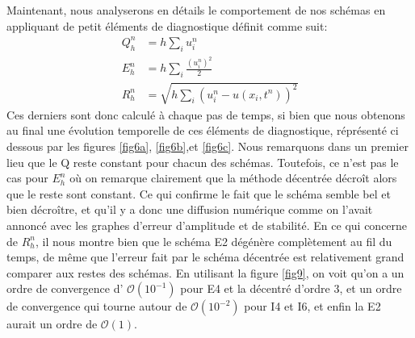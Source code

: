 \documentclass{article}
\begin{document}
Maintenant, nous analyserons en détails le comportement de nos schémas en appliquant de petit éléments de diagnostique définit comme suit:\\
\begin{equation}
    \begin{aligned}
        Q_h^n & = h {\sum}_i u_i^n \\
        E_h^n & = h {\sum}_i \frac{(u_i^n)^2}{2} \\
        R_h^n & = \sqrt{h {\sum}_i (u_i^n - u(x_i,t^n))^2}
    \end{aligned}
\end{equation}
Ces derniers sont donc calculé à chaque pas de temps, si bien que nous obtenons au final une évolution temporelle de ces éléments de diagnostique, réprésenté ci dessous par les figures  \ref{fig6a}, \ref{fig6b},et \ref{fig6c}. Nous remarquons dans un premier lieu que le Q reste constant pour chacun des schémas. Toutefois, ce n'est pas le cas pour $E_h^n$ où on remarque clairement que la méthode décentrée décroît alors que le reste sont constant. Ce qui confirme le fait que le schéma semble bel et bien décroître, et qu'il y a donc une diffusion numérique comme on l'avait annoncé avec les graphes d'erreur d'amplitude et de stabilité. En ce qui concerne de $R_h^n$, il nous montre bien que le schéma E2 dégénère complètement au fil du temps, de même que l'erreur fait par le schéma décentrée est relativement grand comparer aux restes des schémas. En utilisant la figure \ref{fig9}, on voit qu'on a un ordre de convergence d' $\mathcal{O}(10^{-1})$ pour E4 et la décentré d'ordre 3, et un ordre de convergence qui tourne autour de $\mathcal{O}(10^{-2})$ pour I4 et I6, et enfin la E2 aurait un ordre de $\mathcal{O}(1)$.
\end{document}
